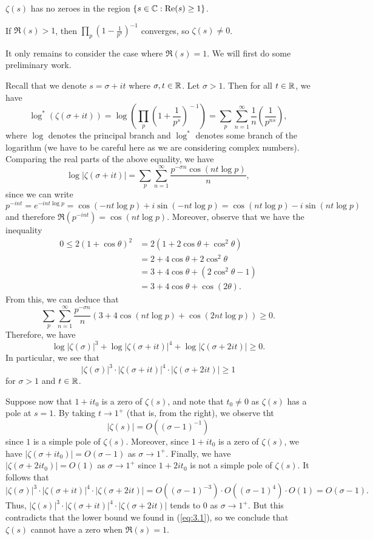 \begin{thm}\label{thm:3.4}
$\zeta(s)$ has no zeroes in the region $\{s \in \mathbb{C} : 
{\rm Re}(s) \geq 1\}$. 
\end{thm}
\begin{pf}
If $\Re(s) > 1$, then $\prod_p (1 - \frac1{p^s})^{-1}$ 
converges, so $\zeta(s) \neq 0$. 

It only remains to consider the case where $\Re(s) = 1$. 
We will first do some preliminary work. 

Recall that we denote $s = \sigma + it$ where $\sigma, t \in \mathbb{R}$. Let $\sigma > 1$. Then for all $ t \in \mathbb{R}$, we have 
\[ \log^*(\zeta(\sigma + it)) = 
\log \left( \prod_p \left(1 + \frac1{p^s}\right)^{\!-1}\right) = \sum_p \sum_{n=1}^\infty \frac1n \left( \frac1{p^{ns}} \right), \]
where $\log$ denotes the principal branch and 
$\log^*$ denotes some branch of the logarithm (we have to be
careful here as we are considering complex numbers). Comparing
the real parts of the above equality, we have 
\[ \log|\zeta(\sigma+it)| = \sum_p \sum_{n=1}^\infty 
\frac{p^{-\sigma n} \cos(nt \log p)}{n}, \]
since we can write 
\[ p^{-int} = e^{-int \log p} = \cos(-nt \log p) + 
i \sin(-nt \log p) = \cos(nt \log p) - i\sin(nt \log p) \]
and therefore $\Re(p^{-int}) = \cos(nt \log p)$. 
Moreover, observe that we have the inequality 
\begin{align*}
    0 \leq 2(1+\cos\theta)^2 
    &= 2(1 + 2\cos\theta + \cos^2\theta) \\
    &= 2 + 4\cos\theta + 2\cos^2\theta \\
    &= 3 + 4\cos\theta + (2\cos^2\theta - 1) \\
    &= 3 + 4\cos\theta + \cos(2\theta). 
\end{align*}
From this, we can deduce that 
\[ \sum_p \sum_{n=1}^\infty \frac{p^{-\sigma n}}n 
(3 + 4\cos(nt \log p) + \cos(2nt \log p)) \geq 0. \]
Therefore, we have 
\[ \log|\zeta(\sigma)|^3 + \log|\zeta(\sigma+it)|^4 + 
\log|\zeta(\sigma+2it)| \geq 0. \]
In particular, we see that 
\begin{equation}
    |\zeta(\sigma)|^3 \cdot |\zeta(\sigma + it)|^4 
    \cdot |\zeta(\sigma+2it)| \geq 1 \label{eq:3.1}
\end{equation} 
for $\sigma > 1$ and $t \in \mathbb{R}$. 

Suppose now that $1 + it_0$ is a zero of $\zeta(s)$, 
and note that $t_0 \neq 0$ as $\zeta(s)$ has a pole at 
$s = 1$. By taking $t \to 1^+$ (that is, from the right), 
we observe tht 
\[ |\zeta(s)| = O((\sigma - 1)^{-1}) \]
since $1$ is a simple pole of $\zeta(s)$. Moreover, 
since $1 + it_0$ is a zero of $\zeta(s)$, we have 
$|\zeta(\sigma + it_0)| = O(\sigma-1)$ as 
$\sigma \to 1^+$. Finally, we have 
$|\zeta(\sigma + 2it_0)| = O(1)$ as $\sigma \to 1^+$ 
since $1 + 2it_0$ is not a simple pole of $\zeta(s)$. 
It follows that 
\[ |\zeta(\sigma)|^3 \cdot |\zeta(\sigma + it)|^4 
\cdot |\zeta(\sigma + 2it)| = 
O((\sigma - 1)^{-3}) \cdot O((\sigma - 1)^4) \cdot O(1) 
= O(\sigma - 1). \]
Thus, $|\zeta(s)|^3 \cdot |\zeta(\sigma+it)|^4 \cdot 
|\zeta(\sigma + 2it)|$ tends to $0$ as $\sigma \to 1^+$. 
But this contradicts that the lower bound we found in (\eqref{eq:3.1}), 
so we conclude that $\zeta(s)$ cannot have a zero when 
$\Re(s) = 1$. 
\end{pf}

